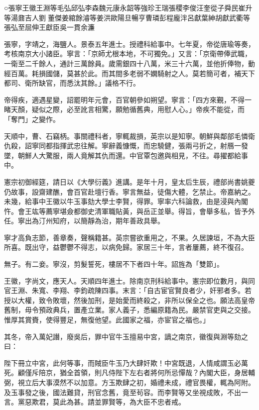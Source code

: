 
\begin{pinyinscope}
○張寧王徽王淵等毛弘邱弘李森魏元康永韶等強珍王瑞張稷李俊汪奎從子舜民崔升等湯鼐吉人劉董傑姜綰餘濬等姜洪歐陽旦暢亨曹璘彭程龐泮呂獻葉紳胡獻武衢等張弘至屈伸王獻臣吳一貫余濂

張寧，字靖之，海鹽人。景泰五年進士。授禮科給事中。七年夏，帝從唐瑜等奏，考核南京大小諸臣。寧言：「京師尤根本地，不可獨免。」又言：「京衛帶俸武職，一衛至二千餘人，通計三萬餘員。歲需銀四十八萬，米三十六萬，並他折俸物，動經百萬。耗損國儲，莫甚於此。而其間多老弱不嫻騎射之人。莫若簡可者，補天下都司、衛所缺官，而悉汰其餘。」議格不行。

帝得疾，適遇星變，詔罷明年元會，百官朝參如朔望。寧言：「四方來覲，不得一睹天顏，疑似之際，必至訛言相驚，願勉循舊典，用慰人心。」帝疾不能從，而「奪門」之變作。

天順中，曹、石竊柄。事關禮科者，寧輒裁損，英宗以是知寧。朝鮮與鄰部毛憐衛仇殺，詔寧同都指揮武忠往解。寧辭義慷慨，而忠驍健，張兩弓折之，射鴈一發墜，朝鮮人大驚服，兩人竟解其仇而還。中官覃包邀與相見，不往。尋擢都給事中。

憲宗初御經筵，請日以《大學衍義》進講。是年十月，皇太后生辰，禮部尚書姚夔仍故事，設齋建醮，會百官赴壇行香。寧言無益，徒傷大體，乞禁止。帝嘉納之。未幾，給事中王徽以牛玉事劾大學士李賢，得罪。寧率六科論救，由是浸與內閣忤。會王竑等薦寧堪僉都御史清軍職貼黃，與岳正並舉。得旨，會舉多私，皆予外任。寧出為汀州知府，以簡靜為治，期年善政具舉。

寧才高負志節，善章奏，聲稱籍甚。英宗嘗欲重用之，不果。久居諫垣，不為大臣所喜。既出守，益鬱鬱不得志，以病免歸。家居三十年，言者屢薦，終不復召。

無子。有二妾。寧沒，剪髮誓死，樓居不下者四十年。詔旌為「雙節」。

王徽，字尚文，應天人。天順四年進士。除南京刑科給事中。憲宗即位數月，與同官王淵、朱寬、李翔、李鈞疏陳四事。末言：「自古宦官賢良者少，奸邪者多。若授以大權，致令敗壞，然後加刑，是始愛而終殺之，非所以保全之也。願法高皇帝舊制，毋令預政典兵，置產立業。家人義子，悉編原籍為民。嚴禁官吏與之交接。惟厚其賞賚，使得豐足，無復他望。此國家之福，亦宦官之福也。」

其冬，帝入萬妃譖，廢吳后，罪中官牛玉擅易中宮，謫之南京，徽復與淵等劾之曰：

陛下冊立中宮，此何等事，而賊臣牛玉乃大肆奸欺！中宮既退，人情咸謂玉必萬死。顧僅斥陪京，猶全首領，則凡侍陛下左右者將何所忌憚哉？內閣大臣，身居輔弼，視立后大事漠然不以加意。方玉欺肆之初，婚禮未成，禮官畏權，輒為阿附。及玉事發之後，國法難貸，刑官念舊，竟至茍容。而李賢等又坐視成敗，不出一言。黨惡欺君，莫此為甚。請並罪賢等，為大臣不忠者戒。


\end{pinyinscope}
